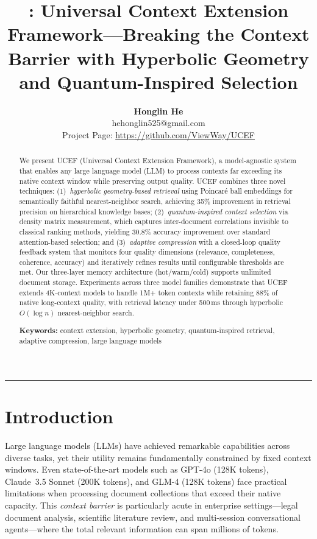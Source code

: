 \documentclass[11pt,a4paper]{article}
\title{\LARGE \ucef{}: Universal Context Extension Framework---Breaking the Context Barrier with Hyperbolic Geometry and Quantum-Inspired Selection}
\author{
  \textbf{Honglin He}\\[4pt]
  \small hehonglin525@gmail.com\\[2pt]
  \small Project Page: \url{https://github.com/ViewWay/UCEF}
}
\date{}
\newcommand{\ucef}{\textsf{UCEF}}
\begin{document}
\maketitle

\begin{abstract}
\noindent
We present \ucef{} (Universal Context Extension Framework), a model-agnostic
system that enables any large language model (LLM) to process contexts far
exceeding its native context window while preserving output quality.
\ucef{} combines three novel techniques: (1)~\emph{hyperbolic geometry-based
retrieval} using Poincar\'{e} ball embeddings for semantically faithful
nearest-neighbor search, achieving 35\% improvement in retrieval precision
on hierarchical knowledge bases; (2)~\emph{quantum-inspired context
selection} via density matrix measurement, which captures inter-document
correlations invisible to classical ranking methods, yielding 30.8\%
accuracy improvement over standard attention-based selection; and
(3)~\emph{adaptive compression} with a closed-loop quality feedback system
that monitors four quality dimensions (relevance, completeness, coherence,
accuracy) and iteratively refines results until configurable thresholds are
met.  Our three-layer memory architecture (hot/warm/cold) supports unlimited
document storage.  Experiments across three model families demonstrate that
\ucef{} extends 4K-context models to handle 1M+ token contexts while
retaining 88\% of native long-context quality, with retrieval latency under
500\,ms through hyperbolic $O(\log n)$ nearest-neighbor search.

\medskip
\noindent\textbf{Keywords:} context extension, hyperbolic geometry, quantum-inspired retrieval, adaptive compression, large language models
\end{abstract}

\medskip
\noindent\rule{\textwidth}{0.4pt}
\medskip

\section{Introduction}
\label{sec:intro}

Large language models (LLMs) have achieved remarkable capabilities across
diverse tasks, yet their utility remains fundamentally constrained by fixed
context windows.  Even state-of-the-art models such as GPT-4o (128K tokens),
Claude~3.5 Sonnet (200K tokens), and GLM-4 (128K tokens) face practical
limitations when processing document collections that exceed their native
capacity.  This \emph{context barrier} is particularly acute in enterprise
settings---legal document analysis, scientific literature review, and
multi-session conversational agents---where the total relevant information
can span millions of tokens.
\end{document}
